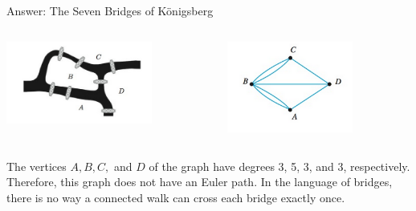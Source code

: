 \documentclass[aspectratio=169]{beamer}
\begin{document}
\begin{frame}[plain]{Answer: The Seven Bridges of K\"{o}nigsberg}

   \begin{columns}[t] %
        \begin{column}[c]{5cm}
          \begin{center}
         \includegraphics[height=2.7cm]{./img/lecture5-fig2.png}
       \end{center}
        \end{column}
       \begin{column}[c]{5cm} %
             \begin{center}
        \includegraphics[height=3cm]{./img/lecture5-fig3.png}
      \end{center}           
        \end{column}
  \end{columns}  
  
  The vertices $A, B, C,$ and $D$ of the graph have degrees 3, 5, 3, and 3, respectively. Therefore,
  this graph does not have an Euler path. In the language of bridges, there is no way a connected walk
  can cross each bridge exactly once.
     
\end{frame}
\end{document}
